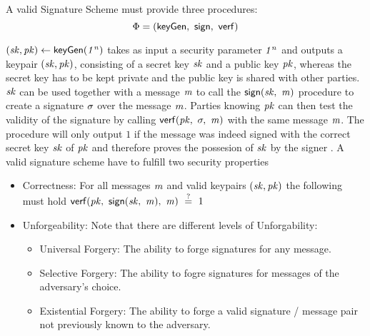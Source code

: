 \begin{definition}\label{def:signatureScheme}
    A valid  Signature Scheme must provide three procedures: 
    \[ \Phi = (\mathsf{keyGen} ,~ \mathsf{sign} ,~ \mathsf{verf}) \]
    
    $(\mathit{sk}, \mathit{pk}) \gets \mathsf{keyGen}(\mathit{1^n})$ takes as input a security parameter $\mathit{1^n}$ and outputs a keypair $(\mathit{sk}, \mathit{pk})$, consisting of a secret key $\mathit{sk}$ and a public key $\mathit{pk}$, whereas
    the secret key has to be kept private and the public key is shared with other parties.
    $\mathit{sk}$ can be used together with a message $\mathit{m}$ to call the $\mathsf{sign}(\mathit{sk} ,~ \mathit{m})$ procedure to create a signature $\sigma$ over the message $\mathit{m}$.
    Parties knowing $\mathit{pk}$ can then test the validity of the signature by calling $\mathsf{verf}(\mathit{pk} ,~ \sigma ,~ \mathit{m})$ with the same message $\mathit{m}$. The procedure will only output $1$ if the message was
    indeed signed with the correct secret key $\mathit{sk}$ of $\mathit{pk}$ and therefore proves the possesion of $\mathit{sk}$ by the signer .
    A valid signature scheme have to fulfill two security properties
    \begin{itemize}
        \item Correctness: For all messages $\mathit{m}$ and valid keypairs $(\mathit{sk}, \mathit{pk})$ the following must hold $\mathsf{verf}(\mathit{pk} ,~ \mathsf{sign}(\mathit{sk} ,~ \mathit{m}) ,~ \mathit{m}) ~\stackrel{?}{=}~ 1$ 
        \item Unforgeability: Note that there are different levels of Unforgability:~\cite{goldwasser1988digital}
        \begin{itemize}
            \item Universal Forgery: The ability to forge signatures for any message.
            \item Selective Forgery: The ability to fogre signatures for messages of the adversary's choice.
            \item Existential Forgery: The ability to forge a valid signature / message pair not previously known to the adversary.
        \end{itemize}
    \end{itemize}
\end{definition}

